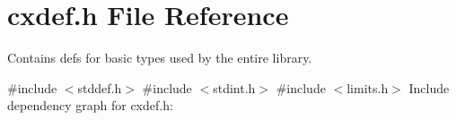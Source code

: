 \hypertarget{a00005}{}\section{cxdef.\+h File Reference}
\label{a00005}


Contains defs for basic types used by the entire library.  


{\ttfamily \#include $<$stddef.\+h$>$}\newline
{\ttfamily \#include $<$stdint.\+h$>$}\newline
{\ttfamily \#include $<$limits.\+h$>$}\newline
Include dependency graph for cxdef.\+h\+:
